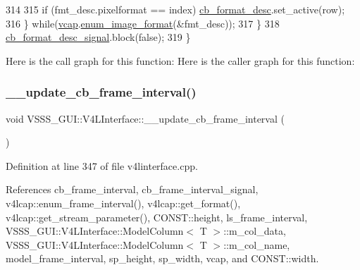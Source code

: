 \begin{DoxyCode}
314 
315                 \textcolor{keywordflow}{if} (fmt\_desc.pixelformat == index) \hyperlink{class_v_s_s_s___g_u_i_1_1_v4_l_interface_a1f6b2f08ccbc0ecbfba96311ac07aa44}{cb\_format\_desc}.set\_active(row);
316             \} \textcolor{keywordflow}{while}(\hyperlink{class_v_s_s_s___g_u_i_1_1_v4_l_interface_a7ece61f4ccc6d5321c445e60f34e7f33}{vcap}.\hyperlink{classv4lcap_a4f5a8ccdd2a75e9d2f2d4d541fdb84dd}{enum\_image\_format}(&fmt\_desc));
317         \}
318         \hyperlink{class_v_s_s_s___g_u_i_1_1_v4_l_interface_a01fe3a5a8d0f0bfa6bb19cdcb138b38d}{cb\_format\_desc\_signal}.block(\textcolor{keyword}{false});
319     \}
\end{DoxyCode}
Here is the call graph for this function\+:
Here is the caller graph for this function\+:
\mbox{\label{class_v_s_s_s___g_u_i_1_1_v4_l_interface_a0eeae871fc38dab3693860f6f391e062}} 
\subsubsection{\texorpdfstring{\+\_\+\+\_\+update\+\_\+cb\+\_\+frame\+\_\+interval()}{\_\_update\_cb\_frame\_interval()}}
{\footnotesize\ttfamily void V\+S\+S\+S\+\_\+\+G\+U\+I\+::\+V4\+L\+Interface\+::\+\_\+\+\_\+update\+\_\+cb\+\_\+frame\+\_\+interval (\begin{DoxyParamCaption}{ }\end{DoxyParamCaption})\hspace{0.3cm}{\ttfamily [private]}}



Definition at line 347 of file v4linterface.\+cpp.



References cb\+\_\+frame\+\_\+interval, cb\+\_\+frame\+\_\+interval\+\_\+signal, v4lcap\+::enum\+\_\+frame\+\_\+interval(), v4lcap\+::get\+\_\+format(), v4lcap\+::get\+\_\+stream\+\_\+parameter(), C\+O\+N\+S\+T\+::height, ls\+\_\+frame\+\_\+interval, V\+S\+S\+S\+\_\+\+G\+U\+I\+::\+V4\+L\+Interface\+::\+Model\+Column$<$ T $>$\+::m\+\_\+col\+\_\+data, V\+S\+S\+S\+\_\+\+G\+U\+I\+::\+V4\+L\+Interface\+::\+Model\+Column$<$ T $>$\+::m\+\_\+col\+\_\+name, model\+\_\+frame\+\_\+interval, sp\+\_\+height, sp\+\_\+width, vcap, and C\+O\+N\+S\+T\+::width.



